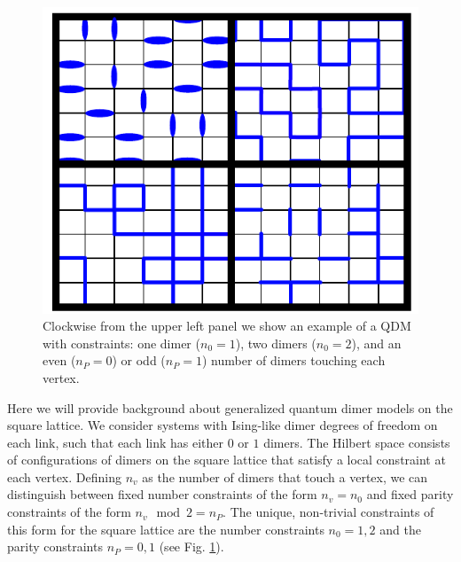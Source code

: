 \documentclass[twocolumn,prb,aps,floatfix,superscriptaddress]{revtex4-1}
\newcommand{\figref}[1]{Fig. \ref{#1}}
\begin{document}
\begin{figure}[htpb]
    \centering
    \includegraphics[width=0.8\linewidth]{example_local_constraints.pdf}
    \caption{Clockwise from the upper left panel we show an example of a QDM with constraints: one
    dimer ($n_0 = 1$), two dimers ($n_0 = 2$), and an even ($n_P = 0$) or odd ($n_P = 1$) number of dimers touching each vertex.}
    \label{fig:example_local_constraints}
\end{figure}

Here we will provide background about generalized quantum dimer models on the square lattice. We consider systems with Ising-like dimer degrees of freedom on each link, such that each link has either $0$ or $1$ dimers. The Hilbert space consists of configurations of dimers on the square lattice that satisfy a local constraint at each vertex. Defining $n_v$ as the number of dimers that touch a vertex, we can distinguish between fixed number constraints of the form $n_v = n_0$ and fixed parity constraints of the form $n_v\mod 2 = n_P$. The unique, non-trivial constraints of this form for the square lattice are the number constraints $n_0=1,2$ and the parity constraints $n_P =0,1$ (see \figref{fig:example_local_constraints}).
\end{document}

